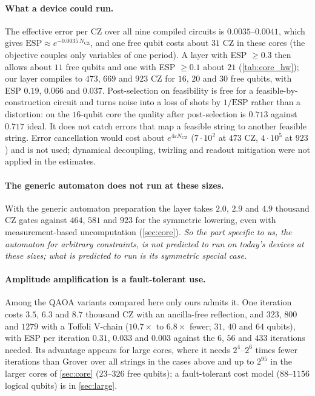 \paragraph{What a device could run.} The effective error per CZ over all nine compiled circuits is $0.0035$--$0.0041$, which gives $\mathrm{ESP}\approx e^{-0.0035\,N_\mathrm{CZ}}$, and one free qubit costs about $31$ CZ in these cores (the objective couples only variables of one period). A layer with ESP $\ge0.3$ then allows about $11$ free qubits and one with ESP $\ge0.1$ about $21$ (\cref{tab:core_hw}); our layer compiles to $473$, $669$ and $923$ CZ for $16$, $20$ and $30$ free qubits, with ESP $0.19$, $0.066$ and $0.037$. Post-selection on feasibility is free for a feasible-by-construction circuit and turns noise into a loss of shots by $1/\mathrm{ESP}$ rather than a distortion: on the $16$-qubit core the quality after post-selection is $0.713$ against $0.717$ ideal. It does not catch errors that map a feasible string to another feasible string. Error cancellation would cost about $e^{4\varepsilon N_\mathrm{CZ}}$ ($7\cdot10^2$ at $473$ CZ, $4\cdot10^5$ at $923$) and is not used; dynamical decoupling, twirling and readout mitigation were not applied in the estimates.

\paragraph{The generic automaton does not run at these sizes.} With the generic automaton preparation the layer takes $2.0$, $2.9$ and $4.9$ thousand CZ gates against $464$, $581$ and $923$ for the symmetric lowering, even with measurement-based uncomputation (\cref{sec:core}). \emph{So the part specific to us, the automaton for arbitrary constraints, is not predicted to run on today's devices at these sizes; what is predicted to run is its symmetric special case.}

\paragraph{Amplitude amplification is a fault-tolerant use.} Among the QAOA variants compared here only ours admits it. One iteration costs $3.5$, $6.3$ and $8.7$ thousand CZ with an ancilla-free reflection, and $323$, $800$ and $1279$ with a Toffoli V-chain ($10.7\times$ to $6.8\times$ fewer; $31$, $40$ and $64$ qubits), with ESP per iteration $0.31$, $0.033$ and $0.003$ against the $6$, $56$ and $433$ iterations needed. Its advantage appears for large cores, where it needs $2^{4}$--$2^{6}$ times fewer iterations than Grover over all strings in the cases above and up to $2^{95}$ in the larger cores of \cref{sec:core} ($23$--$326$ free qubits); a fault-tolerant cost model ($88$--$1156$ logical qubits) is in \cref{sec:large}.

